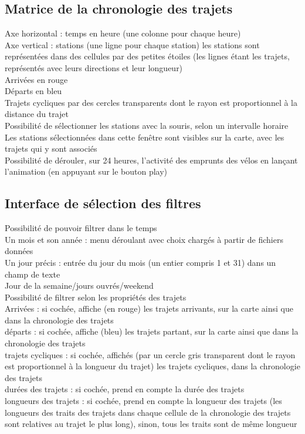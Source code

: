 \documentclass[12pt]{article}
\begin{document}
		\subsection{Matrice de la chronologie des trajets}
		Axe horizontal : temps en heure (une colonne pour chaque heure)\\
		Axe vertical : stations (une ligne pour chaque station) les stations sont représentées dans
		des cellules par des petites étoiles (les lignes étant les trajets, représentés
		avec leurs directions et leur longueur)\\
		Arrivées en rouge\\
		Départs en bleu\\
		Trajets cycliques par des cercles transparents dont le rayon est proportionnel à
		la distance du trajet\\
		Possibilité de sélectionner les stations avec la souris, selon un intervalle horaire
		Les stations sélectionnées dans cette fenêtre sont visibles sur la carte, avec
		les trajets qui y sont associés\\
		Possibilité de dérouler, sur 24 heures, l’activité des emprunts des vélos
		en lançant l’animation (en appuyant sur le bouton play)\\
		
		\subsection{Interface de sélection des filtres}
		Possibilité de pouvoir filtrer dans le temps\\
		Un mois et son année : menu déroulant avec choix chargés à partir de fichiers
		données\\
		Un jour précis : entrée du jour du mois (un entier compris 1 et 31) dans un champ
		de texte\\
		Jour de la semaine/jours ouvrés/weekend\\
		Possibilité de filtrer selon les propriétés des trajets\\
		Arrivées : si cochée, affiche (en rouge) les trajets arrivants, sur la carte ainsi
		que dans la chronologie des trajets\\
		départs : si cochée, affiche (bleu) les trajets partant, sur la carte ainsi que
		dans la chronologie des trajets\\
		trajets cycliques : si cochée, affichés (par un cercle gris transparent dont le
		rayon est proportionnel à la longueur du trajet) les trajets cycliques, dans la
		chronologie des trajets\\
		durées des trajets : si cochée, prend en compte la durée des trajets\\
		longueurs des trajets : si cochée, prend en compte la longueur des trajets
		(les longueurs des traits des trajets dans chaque cellule de la chronologie des
		trajets sont relatives au trajet le plus long), sinon, tous les traits sont
		de même longueur\\
		
\end{document}
